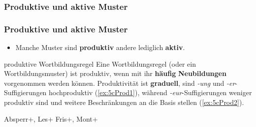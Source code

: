 %
%
%
%
%
%
%
%
%
%
%
%
%
%
\subsubsection{Produktive und aktive Muster}

\begin{frame}
\frametitle{Produktive und aktive Muster}

\begin{itemize}
\item Manche Muster sind \textbf{produktiv} andere lediglich \textbf{aktiv}.
\end{itemize}

\begin{block}{produktive Wortbildungsregel}
Eine Wortbildungsregel (oder ein Wortbildungsmuster) ist produktiv, wenn mit ihr \textbf{häufig} \textbf{Neubildungen} vorgenommen werden können. Produktivität ist \textbf{graduell}, \zB sind \emph{-ung} und \emph{-er}-Suffigierungen hochproduktiv (\ref{ex:5cProd1}), während \emph{-eur}-Suffigierungen weniger produktiv sind und weitere Beschränkungen an die Basis stellen (\ref{ex:5cProd2}). 
\hfill {}
\end{block}

\ea 
\ea \label{ex:5cProd1} Absperr$+$, Les$+$
\ex \label{ex:5cProd2} Fris$+$, Mont$+$ %
\z 
\z 

\end{frame}


